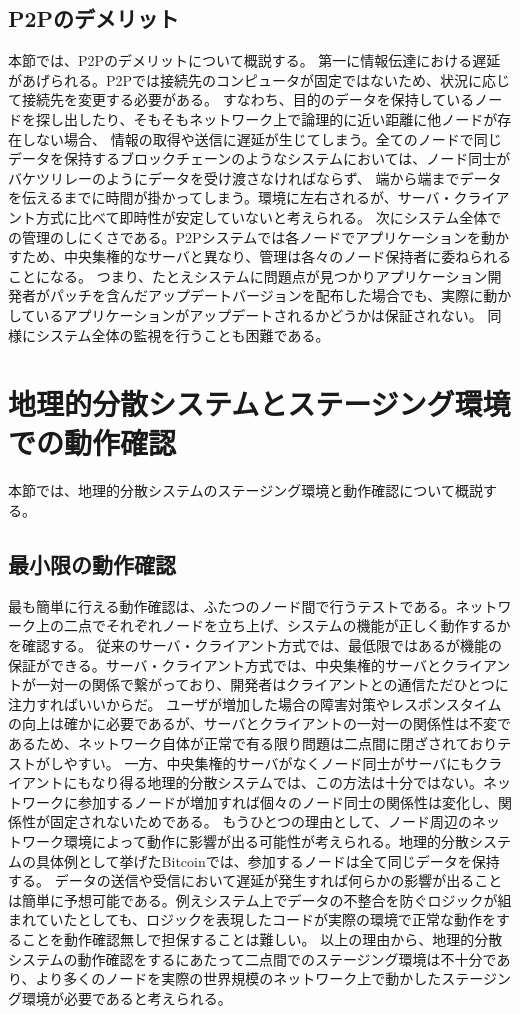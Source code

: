 \subsection{P2Pのデメリット}
本節では、P2Pのデメリットについて概説する。
第一に情報伝達における遅延があげられる。P2Pでは接続先のコンピュータが固定ではないため、状況に応じて接続先を変更する必要がある。
すなわち、目的のデータを保持しているノードを探し出したり、そもそもネットワーク上で論理的に近い距離に他ノードが存在しない場合、
情報の取得や送信に遅延が生じてしまう。全てのノードで同じデータを保持するブロックチェーンのようなシステムにおいては、ノード同士がバケツリレーのようにデータを受け渡さなければならず、
端から端までデータを伝えるまでに時間が掛かってしまう。環境に左右されるが、サーバ・クライアント方式に比べて即時性が安定していないと考えられる。
次にシステム全体での管理のしにくさである。P2Pシステムでは各ノードでアプリケーションを動かすため、中央集権的なサーバと異なり、管理は各々のノード保持者に委ねられることになる。
つまり、たとえシステムに問題点が見つかりアプリケーション開発者がパッチを含んだアップデートバージョンを配布した場合でも、実際に動かしているアプリケーションがアップデートされるかどうかは保証されない。
同様にシステム全体の監視を行うことも困難である。

\section{地理的分散システムとステージング環境での動作確認}
\label{background:staging-environment}
本節では、地理的分散システムのステージング環境と動作確認について概説する。

\subsection{最小限の動作確認}
最も簡単に行える動作確認は、ふたつのノード間で行うテストである。ネットワーク上の二点でそれぞれノードを立ち上げ、システムの機能が正しく動作するかを確認する。
従来のサーバ・クライアント方式では、最低限ではあるが機能の保証ができる。サーバ・クライアント方式では、中央集権的サーバとクライアントが一対一の関係で繋がっており、開発者はクライアントとの通信ただひとつに注力すればいいからだ。
ユーザが増加した場合の障害対策やレスポンスタイムの向上は確かに必要であるが、サーバとクライアントの一対一の関係性は不変であるため、ネットワーク自体が正常で有る限り問題は二点間に閉ざされておりテストがしやすい。
一方、中央集権的サーバがなくノード同士がサーバにもクライアントにもなり得る地理的分散システムでは、この方法は十分ではない。ネットワークに参加するノードが増加すれば個々のノード同士の関係性は変化し、関係性が固定されないためである。
もうひとつの理由として、ノード周辺のネットワーク環境によって動作に影響が出る可能性が考えられる。地理的分散システムの具体例として挙げたBitcoinでは、参加するノードは全て同じデータを保持する。
データの送信や受信において遅延が発生すれば何らかの影響が出ることは簡単に予想可能である。例えシステム上でデータの不整合を防ぐロジックが組まれていたとしても、ロジックを表現したコードが実際の環境で正常な動作をすることを動作確認無しで担保することは難しい。
以上の理由から、地理的分散システムの動作確認をするにあたって二点間でのステージング環境は不十分であり、より多くのノードを実際の世界規模のネットワーク上で動かしたステージング環境が必要であると考えられる。

